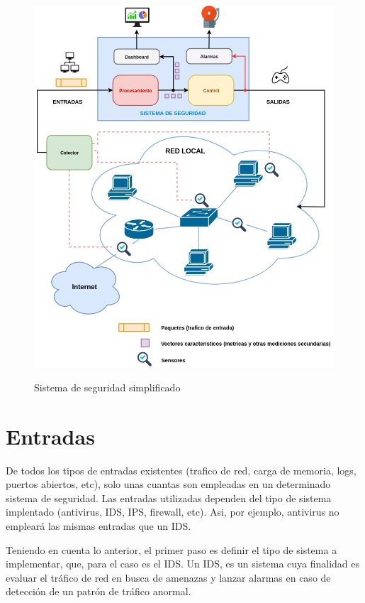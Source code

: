 \documentclass[12pt]{article}
\begin{document}
\begin{figure}[htbp]
\begin{center}
\includegraphics[scale=0.5]{sistema_simplificado3.png}\\[1cm] %
\caption{Sistema de seguridad simplificado}
\end{center}
\end{figure}

\section{Entradas}

De todos los tipos de entradas existentes (trafico de red, carga de
memoria, logs, puertos abiertos, etc), solo unas cuantas son empleadas
en un determinado sistema de seguridad. Las entradas utilizadas
dependen del tipo de sistema implentado (antivirus, IDS, IPS,
firewall, etc). Asi, por ejemplo, antivirus no empleará las mismas
entradas que un IDS.

Teniendo en cuenta lo anterior, el primer paso es definir el tipo de
sistema a implementar, que, para el caso es el IDS. Un IDS, es un
sistema cuya finalidad es evaluar el tráfico de red en busca de
amenazas y lanzar alarmas en caso de detección de un patrón de tráfico
anormal.
\end{document}
